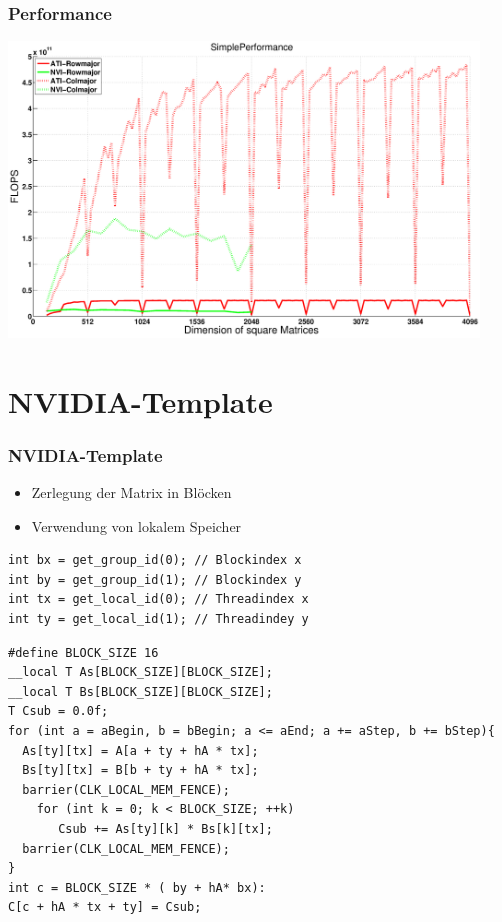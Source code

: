 \documentclass{beamer}
\begin{document}
\begin{frame}
	\frametitle{Performance}
\begin{center}
\includegraphics[width=12.5cm]{SimplePerformance}
\end{center}


	
\end{frame}


\section{NVIDIA-Template}
\begin{frame}[fragile]
\frametitle{NVIDIA-Template}

\begin{itemize}
\item
Zerlegung der Matrix in Bl\"ocken
\item
Verwendung von lokalem Speicher 
\end{itemize}

\begin{lstlisting}[style=customc,caption=NVIDIA-Snippet]
int bx = get_group_id(0); // Blockindex x
int by = get_group_id(1); // Blockindex y
int tx = get_local_id(0); // Threadindex x
int ty = get_local_id(1); // Threadindey y
\end{lstlisting}



\end{frame}


\begin{frame}[fragile]
\begin{lstlisting}[style=customc,caption=NVIDIA-Snippet(2)]
#define BLOCK_SIZE 16
__local T As[BLOCK_SIZE][BLOCK_SIZE];
__local T Bs[BLOCK_SIZE][BLOCK_SIZE]; 
T Csub = 0.0f;
for (int a = aBegin, b = bBegin; a <= aEnd; a += aStep, b += bStep){ 
  As[ty][tx] = A[a + ty + hA * tx];
  Bs[ty][tx] = B[b + ty + hA * tx];
  barrier(CLK_LOCAL_MEM_FENCE);
    for (int k = 0; k < BLOCK_SIZE; ++k)
       Csub += As[ty][k] * Bs[k][tx];
  barrier(CLK_LOCAL_MEM_FENCE);
}
int c = BLOCK_SIZE * ( by + hA* bx):
C[c + hA * tx + ty] = Csub;
\end{lstlisting}


\end{frame}
\end{document}
